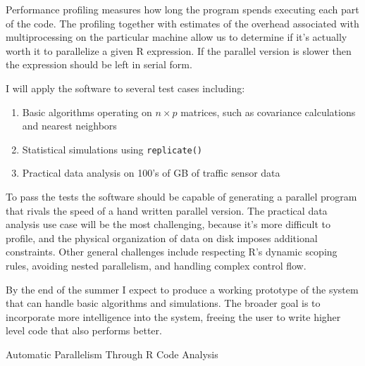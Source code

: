 \documentclass[12pt]{article}
\begin{document}
Performance profiling measures how long the program spends executing each
part of the code. The profiling together with estimates of the overhead
associated with multiprocessing on the particular machine allow us to
determine if it's actually worth it to parallelize a given R expression.
If the parallel version is slower then the expression should
be left in serial form.

I will apply the software to several test cases including:
\begin{enumerate}
    \item Basic algorithms operating on $n \times p$ matrices, such as
        covariance calculations and nearest neighbors
    \item Statistical simulations using \texttt{replicate()}
    \item Practical data analysis on 100's of GB of traffic sensor data 
\end{enumerate}
To pass the tests the software should be capable of generating a parallel
program that rivals the speed of a hand written parallel version. The
practical data analysis use case will be the most challenging, because it's
more difficult to profile, and the physical organization of data on disk
imposes additional constraints.
Other general challenges include respecting R's dynamic scoping rules,
avoiding nested parallelism, and handling complex control flow.

By the end of the summer I expect to produce a working prototype of the
system that can handle basic algorithms and simulations. The broader goal
is to incorporate more intelligence into the system, freeing the user to
write higher level code that also performs better.

% 
% 

\newpage

\begin{center}
    \large Automatic Parallelism Through R Code Analysis 
\end{center}

\hfill
\end{document}
